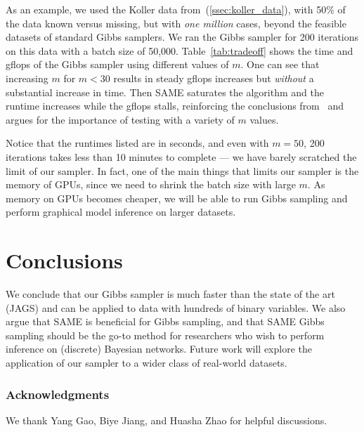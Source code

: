 \documentclass{article} %
\begin{document}
As an example, we used the Koller data from~(\ref{ssec:koller_data}), with 50\% of the data known
versus missing, but with \emph{one million} cases, beyond the feasible datasets of standard Gibbs
samplers. We ran the Gibbs sampler for 200 iterations on this data with a batch size of 50,000.
Table~\ref{tab:tradeoff} shows the time and gflops of the Gibbs sampler using different values of
$m$.  One can see that increasing $m$ for $m < 30$ results in steady gflops increases but
\emph{without} a substantial increase in time. Then SAME saturates the algorithm and the runtime
increases while the gflops stalls, reinforcing the conclusions from~\citep{SAME2015} and argues for
the importance of testing with a variety of $m$ values.

Notice that the runtimes listed are in seconds, and even with $m=50$, 200 iterations takes less than
10 minutes to complete --- we have barely scratched the limit of our sampler. In fact, one of the
main things that limits our sampler is the memory of GPUs, since we need to shrink the batch size
with large $m$. As memory on GPUs becomes cheaper, we will be able to run Gibbs sampling and perform
graphical model inference on larger datasets.


\section{Conclusions}\label{sec:conclusions}

We conclude that our Gibbs sampler is much faster than the state of the art (JAGS) and can be
applied to data with hundreds of binary variables. We also argue that SAME is beneficial for Gibbs
sampling, and that SAME Gibbs sampling should be the go-to method for researchers who wish to
perform inference on (discrete) Bayesian networks. Future work will explore the application of our
sampler to a wider class of real-world datasets.


\subsubsection*{Acknowledgments}

We thank Yang Gao, Biye Jiang, and Huasha Zhao for helpful discussions.



\end{document}
